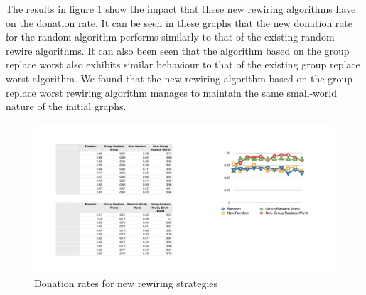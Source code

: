 The results in figure \ref{fig:new_rewiring_results} show the impact that these new rewiring algorithms have on the donation rate. It can be seen in these graphs that the new donation rate for the random algorithm performs similarly to that of the existing random rewire algorithms. It can also been seen that the algorithm based on the group replace worst also exhibits similar behaviour to that of the existing group replace worst algorithm.
We found that the new rewiring algorithm based on the group replace worst rewiring algorithm manages to maintain the same small-world nature of the initial graphs.

\begin{figure}[htbp]
	\centering
	\includegraphics[width=0.7\linewidth]{img/new_rewiring_results.pdf}
	\caption{Donation rates for new rewiring strategies}
	\label{fig:new_rewiring_results}
\end{figure}